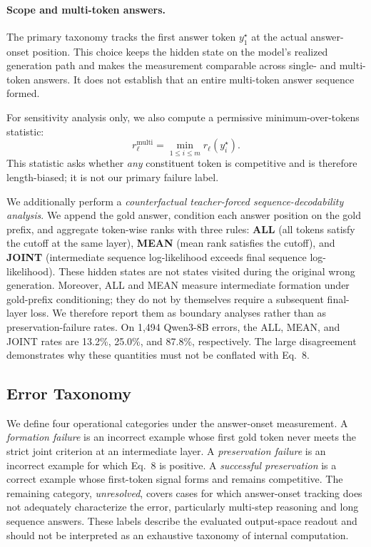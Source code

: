 \documentclass{article} %
\begin{document}
\paragraph{Scope and multi-token answers.}
The primary taxonomy tracks the first answer token $y^\star_1$ at the actual answer-onset position. This choice keeps the hidden state on the model's realized generation path and makes the measurement comparable across single- and multi-token answers. It does not establish that an entire multi-token answer sequence formed.

For sensitivity analysis only, we also compute a permissive minimum-over-tokens statistic:
\begin{equation}
r^{\mathrm{multi}}_\ell = \min_{1 \le i \le m} r_\ell(y^\star_i) .
\end{equation}
This statistic asks whether \emph{any} constituent token is competitive and is therefore length-biased; it is not our primary failure label.

We additionally perform a \emph{counterfactual teacher-forced sequence-decodability analysis}. We append the gold answer, condition each answer position on the gold prefix, and aggregate token-wise ranks with three rules: \textbf{ALL} (all tokens satisfy the cutoff at the same layer), \textbf{MEAN} (mean rank satisfies the cutoff), and \textbf{JOINT} (intermediate sequence log-likelihood exceeds final sequence log-likelihood). These hidden states are not states visited during the original wrong generation. Moreover, ALL and MEAN measure intermediate formation under gold-prefix conditioning; they do not by themselves require a subsequent final-layer loss. We therefore report them as boundary analyses rather than as preservation-failure rates. On 1{,}494 Qwen3-8B errors, the ALL, MEAN, and JOINT rates are 13.2\%, 25.0\%, and 87.8\%, respectively. The large disagreement demonstrates why these quantities must not be conflated with Eq.~8.

\subsection{Error Taxonomy}
We define four operational categories under the answer-onset measurement. A \emph{formation failure} is an incorrect example whose first gold token never meets the strict joint criterion at an intermediate layer. A \emph{preservation failure} is an incorrect example for which Eq.~8 is positive. A \emph{successful preservation} is a correct example whose first-token signal forms and remains competitive. The remaining category, \emph{unresolved}, covers cases for which answer-onset tracking does not adequately characterize the error, particularly multi-step reasoning and long sequence answers. These labels describe the evaluated output-space readout and should not be interpreted as an exhaustive taxonomy of internal computation.
\end{document}
